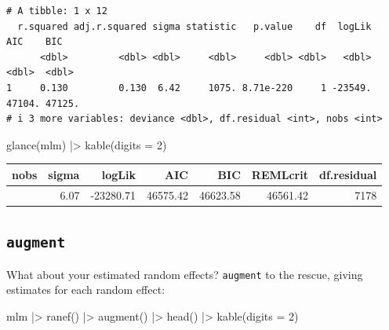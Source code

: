 \documentclass[
  letterpaper,
  DIV=11,
  numbers=noendperiod]{scrreprt}
\newenvironment{Shaded}{}{}
\newcommand{\AttributeTok}[1]{\textcolor[rgb]{0.49,0.56,0.16}{#1}}
\newcommand{\DecValTok}[1]{\textcolor[rgb]{0.25,0.63,0.44}{#1}}
\newcommand{\FunctionTok}[1]{\textcolor[rgb]{0.02,0.16,0.49}{#1}}
\newcommand{\NormalTok}[1]{#1}
\newcommand{\SpecialCharTok}[1]{\textcolor[rgb]{0.25,0.44,0.63}{#1}}
\begin{document}
\begin{verbatim}
# A tibble: 1 x 12
  r.squared adj.r.squared sigma statistic   p.value    df  logLik    AIC    BIC
      <dbl>         <dbl> <dbl>     <dbl>     <dbl> <dbl>   <dbl>  <dbl>  <dbl>
1     0.130         0.130  6.42     1075. 8.71e-220     1 -23549. 47104. 47125.
# i 3 more variables: deviance <dbl>, df.residual <int>, nobs <int>
\end{verbatim}

\begin{Shaded}
\begin{Highlighting}[]
\FunctionTok{glance}\NormalTok{(mlm) }\SpecialCharTok{|\textgreater{}} 
  \FunctionTok{kable}\NormalTok{(}\AttributeTok{digits =} \DecValTok{2}\NormalTok{)}
\end{Highlighting}
\end{Shaded}

\begin{longtable}[]{@{}rrrrrrr@{}}
\toprule\noalign{}
nobs & sigma & logLik & AIC & BIC & REMLcrit & df.residual \\
\midrule\noalign{}
\endhead
\bottomrule\noalign{}
\endlastfoot
7185 & 6.07 & -23280.71 & 46575.42 & 46623.58 & 46561.42 & 7178 \\
\end{longtable}

\subsection{\texorpdfstring{\texttt{augment}}{augment}}\label{augment}

What about your estimated random effects? \texttt{augment} to the
rescue, giving estimates for each random effect:

\begin{Shaded}
\begin{Highlighting}[]
\NormalTok{mlm }\SpecialCharTok{|\textgreater{}} 
  \FunctionTok{ranef}\NormalTok{() }\SpecialCharTok{|\textgreater{}} 
  \FunctionTok{augment}\NormalTok{() }\SpecialCharTok{|\textgreater{}} 
  \FunctionTok{head}\NormalTok{() }\SpecialCharTok{|\textgreater{}} 
  \FunctionTok{kable}\NormalTok{(}\AttributeTok{digits =} \DecValTok{2}\NormalTok{)}
\end{Highlighting}
\end{Shaded}
\end{document}
